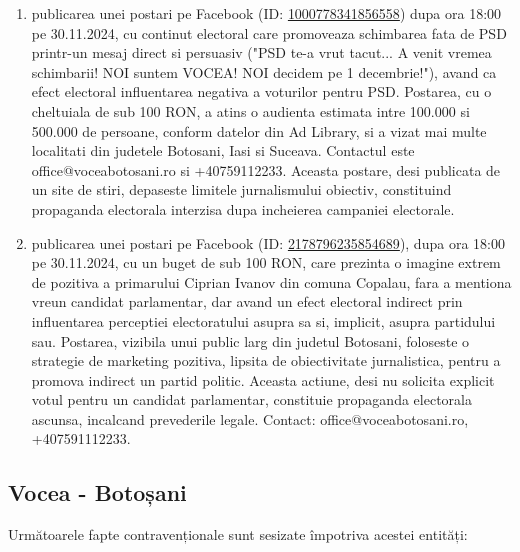 \documentclass[a4paper,12pt]{article}
\begin{document}
\begin{enumerate}[leftmargin=*, label=\arabic*.)]
    \item publicarea unei postari pe Facebook (ID: \href{https://www.facebook.com/ads/library/?id=1000778341856558}{1000778341856558}) dupa ora 18:00 pe 30.11.2024, cu continut electoral care promoveaza schimbarea fata de PSD printr-un mesaj direct si persuasiv ("PSD te-a vrut tacut... A venit vremea schimbarii! NOI suntem VOCEA! NOI decidem pe 1 decembrie!"), avand ca efect electoral influentarea negativa a voturilor pentru PSD. Postarea, cu o cheltuiala de sub 100 RON, a atins o audienta estimata intre 100.000 si 500.000 de persoane, conform datelor din Ad Library, si a vizat mai multe localitati din judetele Botosani, Iasi si Suceava.  Contactul este office@voceabotosani.ro si +40759112233.  Aceasta postare, desi publicata de un site de stiri, depaseste limitele jurnalismului obiectiv, constituind propaganda electorala interzisa dupa incheierea campaniei electorale.
    \item publicarea unei postari pe Facebook (ID: \href{https://www.facebook.com/ads/library/?id=2178796235854689}{2178796235854689}), dupa ora 18:00 pe 30.11.2024, cu un buget de sub 100 RON, care prezinta o imagine extrem de pozitiva a primarului Ciprian Ivanov din comuna Copalau, fara a mentiona vreun candidat parlamentar, dar avand un efect electoral indirect prin influentarea perceptiei electoratului asupra sa si, implicit, asupra partidului sau.  Postarea, vizibila unui public larg din judetul Botosani,  foloseste o strategie de marketing pozitiva, lipsita de obiectivitate jurnalistica, pentru a promova indirect un partid politic.  Aceasta actiune, desi nu solicita explicit votul pentru un candidat parlamentar, constituie propaganda electorala ascunsa, incalcand prevederile legale.  Contact: office@voceabotosani.ro, +407591112233.
\end{enumerate}

\vspace{0.5cm}

\subsection{Vocea - Botoșani}
Următoarele fapte contravenționale sunt sesizate împotriva acestei entități:
\end{document}
